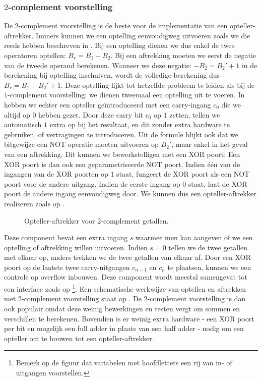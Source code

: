 \subsubsection{$2$-complement voorstelling}
De 2-complement voorstelling is de beste voor de implementatie van een opteller-aftrekker. Immers kunnen we een optelling eenvoudigweg uitvoeren zoals we die reeds hebben beschreven in . Bij een optelling dienen we dus enkel de twee operatoren optellen: $B_r=B_1+B_2$. Bij een aftrekking moeten we eerst de negatie van de tweede operand berekenen. Wanneer we deze negatie: $-B_2=B_2'+1$ in de berekening bij optelling inschuiven, wordt de volledige berekening dus $B_r=B_1+B_2'+1$. Deze optelling lijkt tot hetzelfde probleem te leiden als bij de $1$-complement voorstelling: we dienen tweemaal een optelling uit te voeren. In  hebben we echter een opteller ge\"introduceerd met een carry-ingang $c_0$ die we altijd op $0$ hebben gezet. Door deze carry bit $c_0$ op $1$ zetten, tellen we automatisch $1$ extra op bij het resultaat, en dit zonder extra hardware te gebruiken, of vertragingen te introduceren. Uit de formule blijkt ook dat we bitgewijze een NOT operatie moeten uitvoeren op $B_2'$, maar enkel in het geval van een aftrekking. Dit kunnen we bewerkstelligen met een XOR poort: Een XOR poort is dan ook een geparametriseerde NOT poort. Indien \'e\'en van de ingangen van de XOR poorten op $1$ staat, fungeert de XOR poort als een NOT poort voor de andere uitgang. Indien de eerste ingang op $0$ staat, laat de XOR poort de andere ingang eenvoudigweg door. We kunnen dus een opteller-aftrekker realiseren zoals op .

\begin{figure}[hbt]
\centering
{}
\caption{Opteller-aftrekker voor 2-complement getallen.}
\end{figure}

Deze component bevat een extra ingang $s$ waarmee men kan aangeven of we een optelling of aftrekking willen uitvoeren. Indien $s=0$ tellen we de twee getallen met elkaar op, anders trekken we de twee getallen van elkaar af. Door een XOR poort op de laatste twee carry-uitgangen $c_{n-1}$ en $c_n$ te plaatsen, kunnen we een controle op overflow inbouwen. Deze component wordt meestal samengevat tot een interface zoals op \footnote{Bemerk op de figuur dat variabelen met hoofdletters een rij van in- of uitgangen voorstellen.}. Een schematische werkwijze van optellen en aftrekken met 2-complement voorstelling staat op . De 2-complement voorstelling is dan ook populair omdat deze weinig bewerkingen en testen vergt om sommen en verschillen te berekenen. Bovendien is er weinig extra hardware - een XOR poort per bit en mogelijk een full adder in plaats van een half adder - nodig om een opteller om te bouwen tot een opteller-aftrekker.

